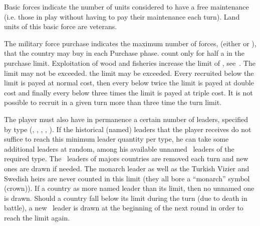  Basic forces indicate the number of units considered
to have a free maintenance (i.e. those in play without having to pay their
maintenance each turn). Land units of this basic force are veterans.

 The military force purchase indicates the
maximum number of forces, (either \LD or \ND), that the country may buy in
each Purchase phase.
\bparag \NGD count only for half a \ND in the purchase limit.
\bparag Exploitation of wood and fisheries increase the limit of \ND,
see~.
\bparag The \ND limit may not be exceeded.
\bparag the \LD limit may be exceeded. Every \LD recruited below the limit is
payed at normal cost, then every \LD below twice the limit is payed at double
cost and finally every \LD below three times the limit is payed at triple
cost.
\bparag It is not possible to recruit in a given turn more \LD than three time
the turn limit.

 The player must also have in permanence a certain
number of leaders, specified by type (\LeaderA, \LeaderG, \LeaderC, \LeaderE,
\LeaderGov). If the historical (named) leaders that the player receives do not
suffice to reach this minimum leader quantity per type, he can take some
additional leaders at random, among his available unnamed \anonyme\ leaders of
the required type.
\bparag The \anonyme\ leaders of majors countries are removed each turn and
new ones are drawn if needed.
\bparag The monarch leader as well as the Turkish Vizier and Swedish heirs are
never counted in this limit (they all bore a ``monarch'' symbol (crown)).
\bparag If a country as more named leader than its limit, then no unnamed one
is drawn.
\bparag Should a country fall below its limit during the turn (due to death in
battle), a new \anonyme\ leader is drawn at the beginning of the next round in
order to reach the limit again.

